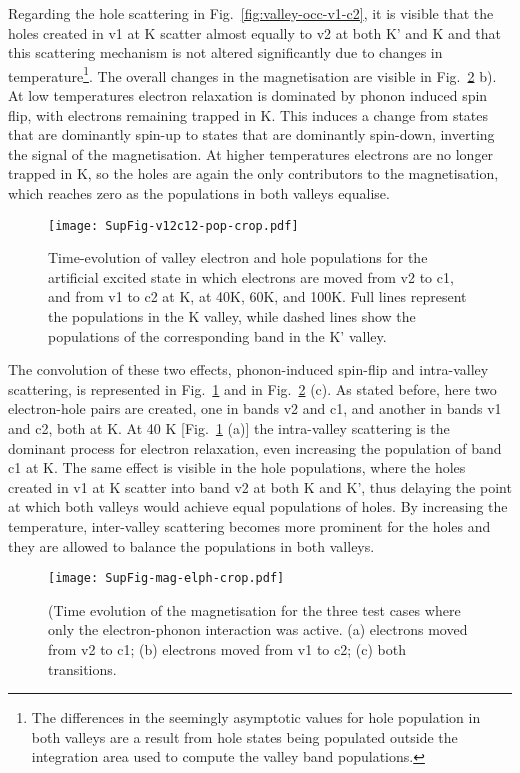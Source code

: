 \documentclass[prb,aps,superscriptaddress,reprint,floatfix]{revtex4-1}
\begin{document}
Regarding the hole scattering in Fig.~\ref{fig:valley-occ-v1-c2}, it is visible that the holes created in v1 at K scatter almost equally to v2 at both K' and K and that this scattering mechanism is not altered significantly due to changes in temperature\footnote{The differences in the seemingly asymptotic values for hole population in both valleys are a result from hole states being populated outside the integration area used to compute the valley band populations.}. The overall changes in the magnetisation are visible in Fig.~\ref{fig:mag-time-elph} b). At low temperatures electron relaxation is dominated by phonon induced spin flip, with electrons remaining trapped in K. This induces a change from states that are dominantly spin-up to states that are dominantly spin-down, inverting the signal of the magnetisation. At higher temperatures electrons are no longer trapped in K, so the holes are again the only contributors to the magnetisation, which reaches zero as the populations in both valleys equalise. 

\begin{figure}[ht]
\texttt{[image: SupFig-v12c12-pop-crop.pdf]}
\caption{Time-evolution of valley electron and hole populations for the artificial excited state in which electrons are moved from v2 to c1, and from v1 to c2 at K, at 40K, 60K, and 100K. Full lines represent the populations in the K valley, while dashed lines show the populations of the corresponding band in the K' valley.}
\label{fig:valley-occ-all}
\end{figure}

The convolution of these two effects, phonon-induced spin-flip and intra-valley scattering, is represented in Fig.~\ref{fig:valley-occ-all} and in Fig.~\ref{fig:mag-time-elph} (c). As stated before, here two electron-hole pairs are created, one in bands v2 and c1, and another in bands v1 and c2, both at K. At 40 K [Fig.~\ref{fig:valley-occ-all} (a)] the intra-valley scattering is the dominant process for electron relaxation, even increasing the population of band c1 at K. The same effect is visible in the hole populations, where the holes created in v1 at K scatter into band v2 at both K and K', thus delaying the point at which both valleys would achieve equal populations of holes. By increasing the temperature, inter-valley scattering becomes more prominent for the holes and they are allowed to balance the populations in both valleys. 

\begin{figure}[ht]
\texttt{[image: SupFig-mag-elph-crop.pdf]}
\caption{(Time evolution of the magnetisation for the three test cases where only the electron-phonon interaction was active. (a) electrons moved from v2 to c1; (b) electrons moved from v1 to c2; (c) both transitions.}
\label{fig:mag-time-elph}
\end{figure}
\end{document}
